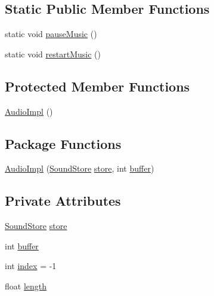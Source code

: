 \subsection*{Static Public Member Functions}
\begin{DoxyCompactItemize}
\item 
static void \mbox{\hyperlink{classorg_1_1newdawn_1_1slick_1_1openal_1_1_audio_impl_a6e79580e117e61f579534c9b3fd5be4d}{pause\+Music}} ()
\item 
static void \mbox{\hyperlink{classorg_1_1newdawn_1_1slick_1_1openal_1_1_audio_impl_af97dda0973c05bd1db4867597410161a}{restart\+Music}} ()
\end{DoxyCompactItemize}
\subsection*{Protected Member Functions}
\begin{DoxyCompactItemize}
\item 
\mbox{\hyperlink{classorg_1_1newdawn_1_1slick_1_1openal_1_1_audio_impl_aa399c5a8b45ad4057febd4ff026f6458}{Audio\+Impl}} ()
\end{DoxyCompactItemize}
\subsection*{Package Functions}
\begin{DoxyCompactItemize}
\item 
\mbox{\hyperlink{classorg_1_1newdawn_1_1slick_1_1openal_1_1_audio_impl_a2496a8ff7cccffb0da40014b24707ee0}{Audio\+Impl}} (\mbox{\hyperlink{classorg_1_1newdawn_1_1slick_1_1openal_1_1_sound_store}{Sound\+Store}} \mbox{\hyperlink{classorg_1_1newdawn_1_1slick_1_1openal_1_1_audio_impl_a1f616264ac2d6ec44cb0c187836d34f5}{store}}, int \mbox{\hyperlink{classorg_1_1newdawn_1_1slick_1_1openal_1_1_audio_impl_ac08b49601da30895fecfdca4e8ba0049}{buffer}})
\end{DoxyCompactItemize}
\subsection*{Private Attributes}
\begin{DoxyCompactItemize}
\item 
\mbox{\hyperlink{classorg_1_1newdawn_1_1slick_1_1openal_1_1_sound_store}{Sound\+Store}} \mbox{\hyperlink{classorg_1_1newdawn_1_1slick_1_1openal_1_1_audio_impl_a1f616264ac2d6ec44cb0c187836d34f5}{store}}
\item 
int \mbox{\hyperlink{classorg_1_1newdawn_1_1slick_1_1openal_1_1_audio_impl_ac08b49601da30895fecfdca4e8ba0049}{buffer}}
\item 
int \mbox{\hyperlink{classorg_1_1newdawn_1_1slick_1_1openal_1_1_audio_impl_ab0e80c9c431d4b6c9b667012f7f71b86}{index}} = -\/1
\item 
float \mbox{\hyperlink{classorg_1_1newdawn_1_1slick_1_1openal_1_1_audio_impl_a7628a9de4830c72d626c640fa6a77afe}{length}}
\end{DoxyCompactItemize}



